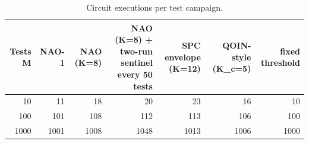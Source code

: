 \begin{table}[t]
\centering
\caption{Circuit executions per test campaign.}
\label{tab:rq5-cost}
\small
\begin{tabular}{rrrrrrr}
\toprule
Tests M & NAO-1 & NAO (K=8) & NAO (K=8) + two-run sentinel every 50 tests & SPC envelope (K=12) & QOIN-style (K_c=5) & fixed threshold \\
\midrule
10 & 11 & 18 & 20 & 23 & 16 & 10 \\
100 & 101 & 108 & 112 & 113 & 106 & 100 \\
1000 & 1001 & 1008 & 1048 & 1013 & 1006 & 1000 \\
\bottomrule
\end{tabular}
\end{table}
